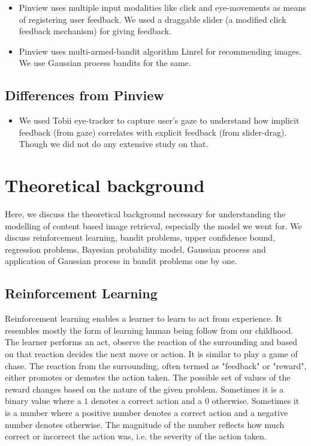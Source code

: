 \documentclass[english]{tktltiki}
\begin{document}
\begin{itemize}
	\item Pinview uses multiple input modalities like click and eye-movements as means of registering user feedback. We used a draggable slider (a modified click feedback mechanism) for giving feedback.
	\item Pinview uses multi-armed-bandit \cite{bandits} algorithm Linrel \cite{linrel} for recommending images. We use Gaussian process bandits for the same.
\end{itemize}

\subsection{Differences from Pinview}

\begin{itemize}
	\item We used Tobii eye-tracker to capture user's gaze to understand how implicit feedback (from gaze) correlates with explicit feedback (from slider-drag). Though we did not do any extensive study on that.
\end{itemize}

\section{Theoretical background}

Here, we discuss the theoretical background necessary for understanding the modelling of content based image retrieval, especially the model we went for. We discuss reinforcement learning, bandit problems, upper confidence bound, regression problems, Bayesian probability model, Gaussian process and application of Gaussian process in bandit problems one by one.


\subsection{Reinforcement Learning}

Reinforcement learning \cite{reinforcement_learning} enables a learner to learn to act from experience. It resembles mostly the form of learning human being follow from our childhood. The learner performs an act, observe the reaction of the surrounding and based on that reaction decides the next move or action. It is similar to play a game of chase. The reaction from the surrounding, often termed as "feedback" or "reward", either promotes or demotes the action taken. The possible set of values of the reward changes based on the nature of the given problem. Sometimes it is a binary value where a $1$ denotes a correct action and a $0$ otherwise. Sometimes it is a number where a positive number denotes a correct action and a negative number denotes otherwise. The magnitude of the number reflects how much correct or incorrect the action was, i.e. the severity of the action taken.
\end{document}
